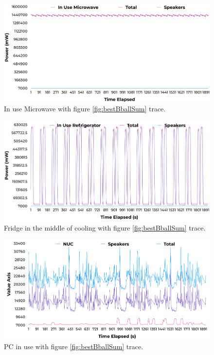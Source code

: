 \begin{figure}[H]
  \centering
  \includegraphics[width=1\textwidth]{figures/inUseuWaveNoise.png}
  \caption{In use Microwave with figure \ref{fig:bestBballSum} trace.}
  \label{fig:uWaveInUse}
\end{figure}

\begin{figure}[H]
  \centering
  \includegraphics[width=1\textwidth]{figures/inUseFridgeNoise.png}
  \caption{Fridge in the middle of cooling with figure \ref{fig:bestBballSum} trace.}
  \label{fig:fridgeInUse}
\end{figure}

\begin{figure}[H]
  \centering
  \includegraphics[width=1\textwidth]{figures/inUseNUCNoise.png}
  \caption{PC in use with figure \ref{fig:bestBballSum} trace.}
  \label{fig:nucInUse}
\end{figure}

